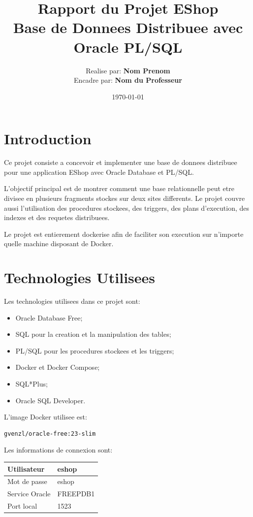 \documentclass[12pt,a4paper]{report}
\title{
    \textbf{Rapport du Projet EShop}\\
    \large Base de Donnees Distribuee avec Oracle PL/SQL
}
\author{
    Realise par: \textbf{Nom Prenom}\\
    Encadre par: \textbf{Nom du Professeur}
}
\date{\today}
\begin{document}
\maketitle
\tableofcontents
\newpage

\chapter{Introduction}

Ce projet consiste a concevoir et implementer une base de donnees distribuee pour une application EShop avec Oracle Database et PL/SQL.

L'objectif principal est de montrer comment une base relationnelle peut etre divisee en plusieurs fragments stockes sur deux sites differents. Le projet couvre aussi l'utilisation des procedures stockees, des triggers, des plans d'execution, des indexes et des requetes distribuees.

Le projet est entierement dockerise afin de faciliter son execution sur n'importe quelle machine disposant de Docker.

\chapter{Technologies Utilisees}

Les technologies utilisees dans ce projet sont:

\begin{itemize}
    \item Oracle Database Free;
    \item SQL pour la creation et la manipulation des tables;
    \item PL/SQL pour les procedures stockees et les triggers;
    \item Docker et Docker Compose;
    \item SQL*Plus;
    \item Oracle SQL Developer.
\end{itemize}

L'image Docker utilisee est:

\begin{lstlisting}[style=textstyle]
gvenzl/oracle-free:23-slim
\end{lstlisting}

Les informations de connexion sont:

\begin{center}
\begin{tabular}{|l|l|}
\hline
Utilisateur & eshop \\
\hline
Mot de passe & eshop \\
\hline
Service Oracle & FREEPDB1 \\
\hline
Port local & 1523 \\
\hline
\end{tabular}
\end{center}
\end{document}
